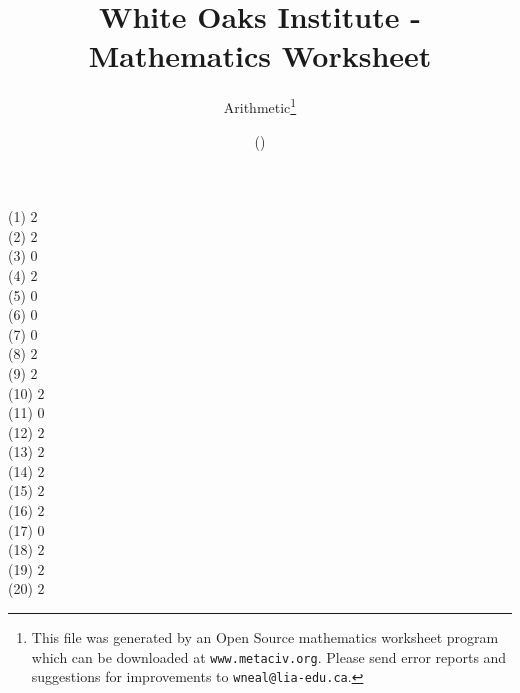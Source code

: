 \documentclass[letter]{article}
\begin{document}
\title{White Oaks Institute - Mathematics Worksheet}
\author{Arithmetic\thanks{This file was generated by an \textsf{Open Source} mathematics worksheet program which can be downloaded at \texttt{www.metaciv.org}. Please send error reports and suggestions for improvements to \texttt{wneal@lia-edu.ca}.}}
\date{\XCfileversion{} (\XCfiledate)}
\maketitle
\begin{multicols}{2}(1) $2$\\(2) $2$\\(3) $0$\\(4) $2$\\(5) $0$\\(6) $0$\\(7) $0$\\(8) $2$\\(9) $2$\\(10) $2$\\(11) $0$\\(12) $2$\\(13) $2$\\(14) $2$\\(15) $2$\\(16) $2$\\(17) $0$\\(18) $2$\\(19) $2$\\(20) $2$\end{multicols}
\end{document}
